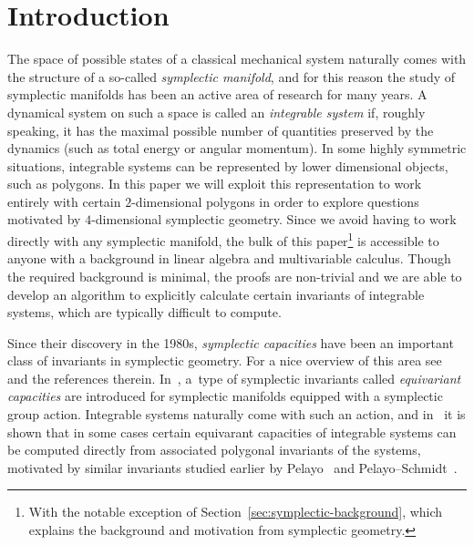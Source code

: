 \documentclass[pdftex]{sigma}
\numberwithin{equation}{section}
\begin{document}


\section{Introduction}

The space of possible states of a classical mechanical
system naturally comes with the structure of a so-called
\emph{symplectic manifold},
and for this reason the study of symplectic manifolds has been an active area of research for many years.
A dynamical system on
such a space is called an \emph{integrable system} if, roughly speaking, it has the maximal
possible number of quantities preserved by the dynamics (such as total energy or angular momentum).
In some highly symmetric situations, integrable systems can be represented by lower dimensional objects, such as polygons.
In this paper we will exploit this representation to
work entirely with certain $2$-dimensional polygons in order to
explore questions motivated by $4$-dimensional symplectic geometry.
Since we avoid having to work directly with any symplectic manifold, the bulk of this paper\footnote{With the notable exception of Section~\ref{sec:symplectic-background}, which explains the background and motivation from symplectic geometry.} is accessible to anyone with a background in linear algebra and multivariable calculus.
Though the required background is minimal, the proofs are non-trivial and we are able to develop an algorithm to explicitly calculate certain invariants of integrable systems, which are typically difficult to compute.

Since their discovery in the 1980s, \emph{symplectic capacities}
have been an important class of invariants in symplectic
geometry.
For a nice overview of this area see~\cite{CiHoLaSc2007} and the references therein. In~\cite{FiPaPe2016}, a~type of symplectic
invariants called \emph{equivariant capacities} are introduced for symplectic manifolds equipped with a symplectic group action. Integrable systems naturally come with such an action, and in~\cite{FiPaPe2016} it is shown that in some cases certain equivarant capacities of integrable systems can be computed directly from associated polygonal invariants of the systems, motivated by similar invariants studied earlier by Pelayo~\cite{Pe2006,Pe2007} and Pelayo--Schmidt~\cite{PeSc2008}.
\end{document}
